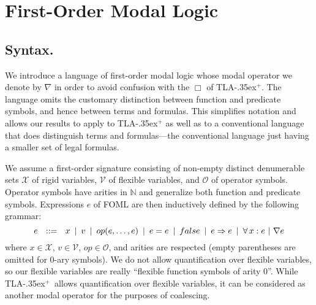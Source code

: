 \documentclass{easychair}
\renewcommand{\implies}{\Rightarrow}
\newcommand{\tlaplus}{\mbox{TLA\kern -.35ex$^+$}\xspace}
\newcommand{\nat}{\mathbb{N}}
\newcommand{\modal}{\nabla}
\newcommand{\OO}{\mathcal{O}}
\newcommand{\VV}{\mathcal{V}}
\newcommand{\XX}{\mathcal{X}}
\newcommand{\edmargin}[2]{\marginpar{\raggedright\footnotesize\color{red}#1: #2}}
\newcommand{\edmargin}[2]{}
\def\smnote{\ednote{SM}}
\def\smmargin{\edmargin{SM}}
\def\A{\forall\,}
\newcommand{\FALSE}{\mbox{\sc false}}
\begin{document}
\section{First-Order Modal Logic}
\label{sec:foml}
\subsection{Syntax.}

We introduce a language of first-order modal logic whose modal operator we
denote by $\modal$ in order to avoid confusion with the $\Box$ of \tlaplus.
The language omits the
customary distinction between function and predicate symbols, and
hence between terms and formulas.  This simplifies notation and allows our
results to apply to \tlaplus as well as to a conventional language
that does distinguish terms and formulas---the conventional
language just having a smaller set
of legal formulas.

We assume a first-order signature consisting of non-empty distinct denumerable sets
$\XX$ of rigid variables, $\VV$ of flexible variables, and $\OO$ of operator symbols.
Operator symbols have arities in $\nat$ and generalize both function and predicate symbols.
Expressions $e$ of FOML are then inductively defined by the following grammar:
%
 \[
  e\ \ ::=\ \
  x\ \,|\,\
  v\ \,|\,\
  op(e,\ldots,e)\ \,|\,\
  e = e\ \,|\,\
  \FALSE\ \,|\,\
  e \implies e\ \,|\,\
  \A x: e\ |\
  \modal e
 \]
%
%
where $x \in \XX$, $v \in \VV$, $op \in \OO$, and arities are
respected (empty parentheses are omitted for $0$-ary symbols).  We do
not allow quantification over flexible variables, so our flexible
variables are really ``flexible function symbols of arity 0''.
While \tlaplus\ allows quantification
over flexible variables,
it can be considered as another modal operator for the purposes of coalescing.
\end{document}
